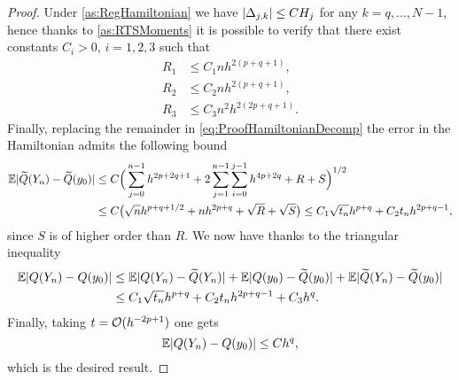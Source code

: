 \documentclass[10pt]{article}
\begin{document}
\begin{proof}
	Under \cref{as:RegHamiltonian} we have $\lvert\Delta_{j,k}\rvert \leq CH_j$ for any $k = q, \ldots, N-1$, hence thanks to \cref{as:RTSMoments} it is possible to verify that there exist constants $C_i > 0$, $i = 1, 2, 3$ such that
	\begin{equation}
	\begin{aligned}
		R_1 &\leq C_1nh^{2(p+q+1)}, \\
		R_2 &\leq C_2nh^{2(p+q+1)}, \\
		R_3 &\leq C_3n^2h^{2(2p+q+1)}.
	\end{aligned}
	\end{equation}
	Finally, replacing the remainder in \eqref{eq:ProofHamiltonianDecomp} the error in the Hamiltonian admits the following bound
	\begin{equation}
	\begin{aligned}
		\operatorname{\mathbb{E}} \lvert\widetilde Q(Y_n) - \widetilde Q(y_0)\rvert &\leq C \Big(\sum_{j=0}^{n-1} h^{2p+2q+1} + 2\sum_{j=1}^{n-1} \sum_{i=0}^{j-1} h^{4p+2q} + R + S\Big)^{1/2} \\
		&\leq C \big(\sqrt{n} h^{p+q+1/2} + n h^{2p+q} + \sqrt{R} + \sqrt{S}\big) \leq C_1 \sqrt{t_n} h^{p+q} + C_2 t_n h^{2p+q-1},
	\end{aligned}
	\end{equation}
	since $S$ is of higher order than $R$. We now have thanks to the triangular inequality
	\begin{equation}
	\begin{aligned}
		\operatorname{\mathbb{E}}\lvert Q(Y_n) - Q(y_0)\rvert &\leq \operatorname{\mathbb{E}}\lvert Q(Y_n) - \widetilde Q(Y_n)\rvert + \operatorname{\mathbb{E}} \lvert Q(y_0) - \widetilde Q (y_0)\rvert + \operatorname{\mathbb{E}}\lvert\widetilde Q(Y_n) - \widetilde Q(y_0)\rvert \\
		&\leq C_1 \sqrt{t_n} h^{p+q} + C_2 t_n h^{2p+q-1} + C_3h^q.
	\end{aligned}
	\end{equation}
	Finally, taking $t = \mathcal{O}(h^{-2p+1})$ one gets
	\begin{equation}
		\operatorname{\mathbb{E}}\lvert Q(Y_n) - Q(y_0)\rvert \leq Ch^{q},
	\end{equation}
	which is the desired result.
\end{proof}
\end{document}

